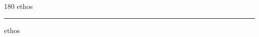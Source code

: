 
\begin{frame}
\begin{center}
\begin{turn}{180}
{\fontsize{2.5cm}{1em}\selectfont ethos}
\end{turn}
\vspace{1em}\par  
\hrule
\vspace{1em}\par  
{\fontsize{2.5cm}{1em}\selectfont ethos}
\end{center}
\end{frame}
